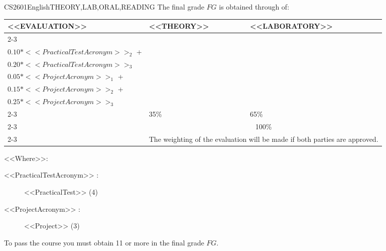   \begin{evaluation}{CS2601}{English}{THEORY,LAB,ORAL,READING}
  The final grade $FG$ is obtained through of:
 
  \begin{tabularx}{0.9\textwidth}{|X|p{}|p{}|} \hline
    \multirow{4}{*}{\uppercase{<<Evaluation>>}} & \uppercase{<<Theory>>} & \uppercase{<<Laboratory>>} \\ \cline{2-3}
    & %
        \begin{minipage}{0.95\textwidth}
        \begin{tabular}{l}
            $0.05*<<PracticalTestAcronym>>_{1}$  + \\
            $0.10*<<PracticalTestAcronym>>_{2}$  + \\
            $0.20*<<PracticalTestAcronym>>_{3}$
        \end{tabular} 
        \end{minipage} 
    & %
        \begin{minipage}{0.95\textwidth}
        \begin{tabular}{l}
            $0.20*<<PracticalTestAcronym>>_{4}$  + \\
            $0.05*<<ProjectAcronym>>_{1}$  + \\
            $0.15*<<ProjectAcronym>>_{2}$  + \\
            $0.25*<<ProjectAcronym>>_{3}$
        \end{tabular} 
        \end{minipage}                 \\ \cline{2-3}
    
    & %
    35\% 
    & %
    65\% \\ \cline{2-3}
    & \multicolumn{2}{|c|}{100\%}  \\ \cline{2-3}
    & \multicolumn{2}{|c|}{The weighting of the evaluation will be made if both parties are approved.}  \\ \hline
    \end{tabularx}
      
    \vspace{2mm}
    \noindent <<Where>>:
    \begin{description}
        \item[<<PracticalTestAcronym>> :] <<PracticalTest>>  (4)
        \item[<<ProjectAcronym>> :] <<Project>> (3)
    \end{description}
 
  \noindent To pass the course you must obtain 11 or more in the final grade $FG$.
  \end{evaluation}

